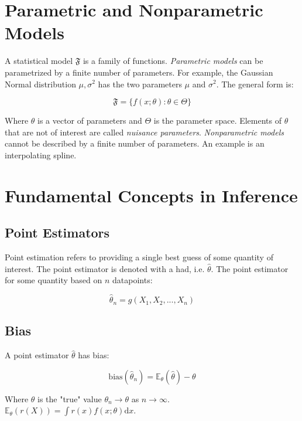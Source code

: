 \section{Parametric and Nonparametric Models}

A statistical model $\mathfrak{F}$ is a family of functions. \textit{Parametric models} can be parametrized by a finite number of parameters. For example, the Gaussian Normal distribution $\mathscr{\mu,\sigma^2}$ has the two parameters $\mu$ and $\sigma^2$. The general form is:

\begin{equation}
\mathfrak{F} = \{f(x;\theta): \theta \in \Theta \}
\end{equation}

Where $\theta$ is a vector of parameters and $\Theta$ is the parameter space. Elements of $\theta$ that are not of interest are called \textit{nuisance parameters}. \textit{Nonparametric models} cannot be described by a finite number of parameters. An example is an interpolating spline.


\section{Fundamental Concepts in Inference}


\subsection{Point Estimators}
Point estimation refers to providing a single best guess of some quantity of interest. The point estimator is denoted with a had, i.e. $\hat{\theta}$. The point estimator for some quantity based on $n$ datapoints:

\begin{equation}
\hat{\theta}_n = g(X_1,X_2,...,X_n)
\end{equation}


\subsection{Bias}
A point estimator $\hat{\theta}$ has bias:

\begin{equation}
\mathrm{bias}(\hat{\theta}_n) = \mathbb{E}_\theta (\hat{\theta}) - \theta
\end{equation}

Where $\theta$ is the "true" value $\theta_n \rightarrow \theta$ as $n \rightarrow \infty$. $\mathbb{E}_{\theta}(r(X)) = \int r(x) f(x;\theta) \mathrm{d}x$. 

